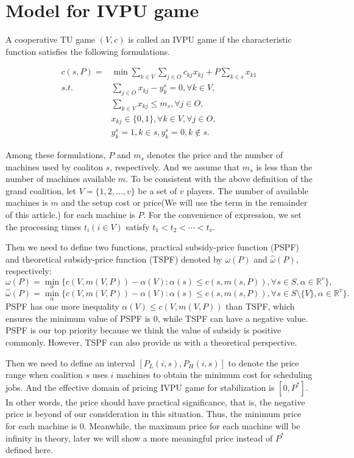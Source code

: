 \section*{Model for IVPU game}

A cooperative TU game $(V,c)$ is called an IVPU game if the characteristic function satisfies the following formulations.

\[
\begin{aligned}
c(s,P) = & {\min} \sum_{k\in V}\sum_{j\in O} {c_{kj} x_{kj}} + {P\sum_{k\in s} x_{k1}} \\
{s.t.}\quad & \sum_{j \in O} x_{kj}-y_k^s=0, \forall k \in V, \\
& \sum_{k\in V} x_{kj} \leq m_s,\forall j \in O,  \\
& x_{kj} \in \{0,1\} , \forall k \in V, \forall j \in O,\\
& y_k^s=1, k \in s, y_k^s=0, k \notin s.
\end{aligned}
\]

Among these formulations, $P$ and $m_s$ denotes the price and the number of machines used by coaliton $s$, respectively. And we assume that $m_s$ is less than the number of machines available $m$.
To be consistent with the above definition of the grand coalition, let $V=\{1,2,\ldots,v\}$ be a set of $v$ players. The number of available machines is $m$ and the setup cost or price(We will use the term in the remainder of this article.) for each machine is $P$.
For the convenience of expression, we set the processing times $t_i(i\in V)$ satisfy $t_1<t_2<\cdots<t_v$.

Then we need to define two functions, practical subsidy-price function (PSPF) and theoretical subsidy-price function (TSPF) denoted by $\omega(P)$ and $\hat{\omega}(P)$, respectively:
\[
  {\omega(P)}=\mathop{\min}_{\alpha}\{c(V,m(V,P))-\alpha(V): \alpha(s)\leq c(s,m(s,P))
 ,\forall s \in S, \alpha\in\mathbb{R}^{v}\},
\]
\[
  {\hat{\omega}(P)}=\mathop{\min}_{\alpha}\{c(V,m(V,P))-\alpha(V): \alpha(s)\leq c(s,m(s,P))
 ,\forall s \in S\setminus\{V\}, \alpha\in\mathbb{R}^{v}\}.
\]
PSPF has one more inequality $\alpha(V)\leq c(V,m(V,P))$ than TSPF, which ensures the minimum value of PSPF is 0, while TSPF can have a negative value. PSPF is our top priority because we think the value of subsidy is positive commonly. However, TSPF can also provide us with a theoretical perspective.

Then we need to define an interval $[P_L(i,s),P_H(i,s)]$ to denote the price range when coalition $s$ uses $i$ machines to obtain the minimum cost for scheduling jobs. And the effective domain of pricing IVPU game for stabilization is $[0,P^*]$.
In other words, the price should have practical significance, that is, the negative price is beyond of our consideration in this situation. Thus, the minimum price for each machine is 0. Meanwhile, the maximum price for each machine will be infinity in theory, later we will show a more meaningful price instead of $P^*$ defined here.


